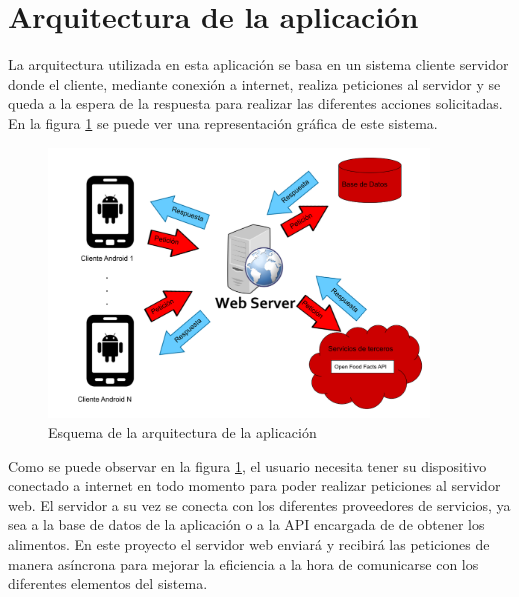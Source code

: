 \section{Arquitectura de la aplicación}
La arquitectura utilizada en esta aplicación se basa en un sistema cliente servidor donde el cliente, mediante conexión a internet, realiza peticiones al servidor y se queda a la espera de la respuesta  para realizar las diferentes acciones solicitadas. En la figura \ref{fig:arquitectura_del_sistema} se puede ver una representación gráfica de este sistema. 

\begin{figure}[H]
    \centering
    \includegraphics[width=0.9\textwidth]{Images/Capitulo6/arquitectura.png}
    \caption{Esquema de la arquitectura de la aplicación}
    \label{fig:arquitectura_del_sistema}
\end{figure}

Como se puede observar en la figura \ref{fig:arquitectura_del_sistema}, el usuario necesita tener su dispositivo conectado a internet en todo momento para poder realizar peticiones al servidor web. El servidor a su vez se conecta con los diferentes proveedores de servicios, ya sea a la base de datos de la aplicación o a la API encargada de de obtener los alimentos.
En este proyecto el servidor web enviará y recibirá las peticiones de manera asíncrona para mejorar la eficiencia a la hora de comunicarse con los diferentes elementos del sistema.
